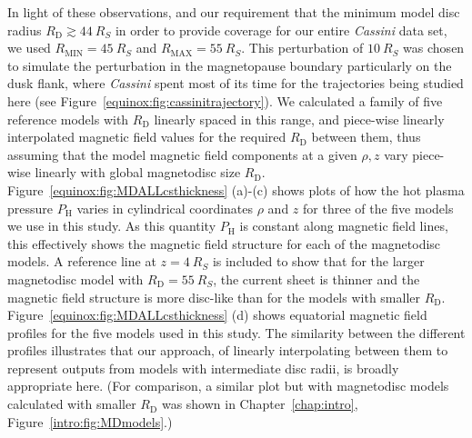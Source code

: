 In light of these observations, and our requirement that the minimum model disc radius $R_\mathrm{D} \gtrsim \SI{44}{R_S}$ in order to provide coverage for our entire \textit{Cassini} data set, we used $R_\mathrm{MIN} = \SI{45}{R_S}$ and $R_\mathrm{MAX}=\SI{55}{R_S}$. This perturbation of $\SI{10}{R_S}$ was chosen to simulate the perturbation in the magnetopause boundary particularly on the dusk flank, where \textit{Cassini} spent most of its time for the trajectories being studied here (see Figure~\ref{equinox:fig:cassinitrajectory}). We calculated a family of five reference models with $R_\mathrm{D}$ linearly spaced in this range, and piece-wise linearly interpolated magnetic field values for the required $R_\mathrm{D}$ between them, thus assuming that the model magnetic field components at a given $\rho,z$ vary piece-wise linearly with global magnetodisc size $R_\mathrm{D}$. Figure~\ref{equinox:fig:MDALLcsthickness} (a)-(c) shows plots of how the hot plasma pressure $P_\mathrm{H}$ varies in cylindrical coordinates $\rho$ and $z$ for three of the five models we use in this study. As this quantity $P_\mathrm{H}$ is constant along magnetic field lines, this effectively shows the magnetic field structure for each of the magnetodisc models. A reference line at $z=\SI{4}{R_S}$ is included to show that for the larger magnetodisc model with $R_\mathrm{D}=\SI{55}{R_S}$, the current sheet is thinner and the magnetic field structure is more disc-like than for the models with smaller $R_\mathrm{D}$. Figure~\ref{equinox:fig:MDALLcsthickness} (d) shows equatorial magnetic field profiles for the five models used in this study. The similarity between the different profiles illustrates that our approach, of linearly interpolating between them to represent outputs from models with intermediate disc radii, is broadly appropriate here. (For comparison, a similar plot but with magnetodisc models calculated with smaller $R_\mathrm{D}$ was shown in Chapter~\ref{chap:intro}, Figure~\ref{intro:fig:MDmodels}.)


